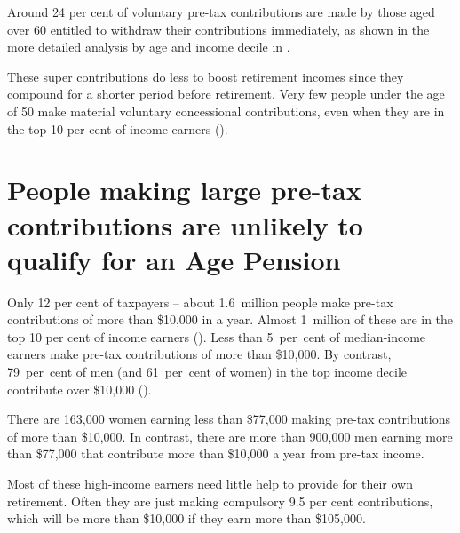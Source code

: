Around 24 per cent of voluntary pre-tax contributions are made by those aged over 60 entitled to withdraw their contributions immediately, as shown in the more detailed analysis by age and income decile in .

These super contributions do less to boost retirement incomes since they compound for a shorter period before retirement. Very few people under the age of 50 make material voluntary concessional contributions, even when they are in the top 10 per cent of income earners ().

\section{People making large pre-tax contributions are unlikely to qualify for an Age Pension}
Only 12 per cent of taxpayers – about 1.6~million people make pre-tax contributions of more than \$10,000 in a year. Almost 1~million of these are in the top 10 per cent of income earners (). Less than 5~per~cent of median-income earners make pre-tax contributions of more than \$10,000. By contrast, 79~per~cent of men (and 61~per~cent of women) in the top income decile contribute over \$10,000 (). 

There are 163,000 women earning less than \$77,000 making pre-tax contributions of more than \$10,000. In contrast, there are more than 900,000 men earning more than \$77,000 that contribute more than \$10,000 a year from pre-tax income.

Most of these high-income earners need little help to provide for their own retirement. Often they are just making compulsory 9.5 per cent contributions, which will be more than \$10,000 if they earn more than \$105,000.

